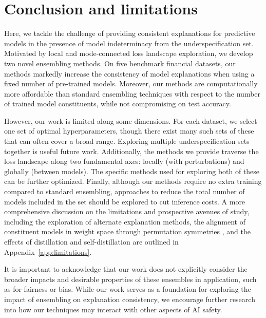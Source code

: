 \section{Conclusion and limitations}
\label{sec:limitations}

Here, we tackle the challenge of providing consistent explanations for predictive models in the presence of model indeterminacy from the underspecification set. Motivated by local and mode-connected loss landscape exploration, we develop two novel ensembling methods. On five benchmark financial datasets, our methods markedly increase the consistency of model explanations when using a fixed number of pre-trained models. Moreover, our methods are computationally more affordable than standard ensembling techniques with respect to the number of trained model constituents, while not compromising on test accuracy.

However, our work is limited along some dimensions. For each dataset, we select one set of optimal hyperparameters, though there exist many such sets of these that can often cover a broad range. Exploring multiple underspecification sets together is useful future work. Additionally, the methods we provide traverse the loss landscape along two fundamental axes: locally (with perturbations) and globally (between models). The specific methods used for exploring both of these can be further optimized. Finally, although our methods require no extra training compared to standard ensembling, approaches to reduce the total number of models included in the set should be explored to cut inference costs. A more comprehensive discussion on the limitations and prospective avenues of study, including the exploration of alternate explanation methods, the alignment of constituent models in weight space through permutation symmetries \citep{ainsworth2023, singh2020, tatro2020}, and the effects of distillation \citep{hinton2015} and self-distillation \citep{furlanello2018} are outlined in Appendix~\ref{app:limitations}.

It is important to acknowledge that our work does not explicitly consider the broader impacts and desirable properties of these ensembles in application, such as for fairness or bias. While our work serves as a foundation for exploring the impact of ensembling on explanation consistency, we encourage further research into how our techniques may interact with other aspects of AI safety.
